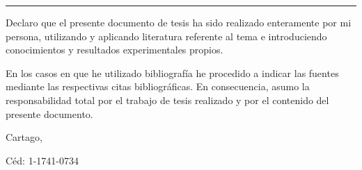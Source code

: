 \thispagestyle{empty}

\rule{10mm}{0pt}

\vfill

Declaro que el presente documento de tesis ha sido realizado enteramente
por mi persona, utilizando y aplicando literatura referente al tema e
introduciendo conocimientos y resultados experimentales propios.

En los casos en que he utilizado bibliografía he procedido a indicar las
fuentes mediante las respectivas citas bibliográficas.  En consecuencia,
asumo la responsabilidad total por el trabajo de tesis realizado y por
el contenido del presente documento.

\vspace*{8mm}

\begin{flushright}
  \thesisAuthor\par
  Cartago, \FechaFinal\par
  Céd: 1-1741-0734
\end{flushright}

\cleardoublepage

